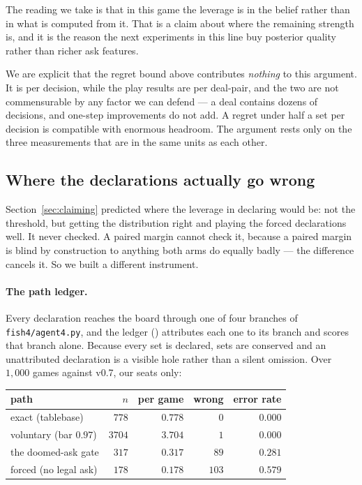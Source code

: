 \documentclass[11pt,a4paper]{article}
\begin{document}
The reading we take is that in this game the leverage is in the belief rather
than in what is computed from it. That is a claim about where the remaining
strength is, and it is the reason the next experiments in this line buy
posterior quality rather than richer ask features.

We are explicit that the regret bound above contributes \emph{nothing} to this
argument. It is per decision, while the play results are per deal-pair, and the
two are not commensurable by any factor we can defend --- a deal contains dozens
of decisions, and one-step improvements do not add. A regret under half a set per
decision is compatible with enormous headroom. The argument rests only on the
three measurements that are in the same units as each other.

\subsection{Where the declarations actually go wrong}
\label{sec:res-pathledger}

Section~\ref{sec:claiming} predicted where the leverage in declaring would be:
not the threshold, but getting the distribution right and playing the forced
declarations well. It never checked. A paired margin cannot check it, because a
paired margin is blind by construction to anything both arms do equally badly
--- the difference cancels it. So we built a different instrument.

\paragraph{The path ledger.} Every declaration reaches the board through one
of four branches of \texttt{fish4/agent4.py}, and the ledger
() attributes each one to its branch and scores
that branch alone. Because every set is declared, sets are conserved and an
unattributed declaration is a visible hole rather than a silent omission. Over
$1{,}000$ games against v0.7, our seats only:

\begin{center}
\small
\begin{tabular}{lrrrr}
\toprule
path & $n$ & per game & wrong & error rate \\
\midrule
exact (tablebase) & $778$ & $0.778$ & $0$ & $0.000$ \\
voluntary (bar $0.97$) & $3704$ & $3.704$ & $1$ & $0.000$ \\
the doomed-ask gate & $317$ & $0.317$ & $89$ & $\mathbf{0.281}$ \\
forced (no legal ask) & $178$ & $0.178$ & $103$ & $\mathbf{0.579}$ \\
\bottomrule
\end{tabular}
\end{center}
\end{document}
